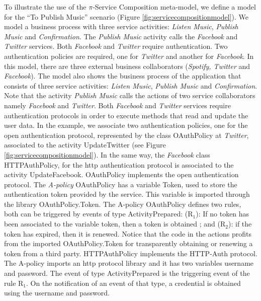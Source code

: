 \begin{example}\label{ex:toPublicMusic4}
To illustrate the use of the $\pi$-Service Composition meta-model, we define a model for the ``To Publish Music'' scenario (Figure \ref{fig:servicecompositionmodel}). 
 We model a business process with three service activities: {\em Listen Music}, {\em Publish Music} and {\em Confirmation}. 
The {\em Publish Music} activity calls the {\em Facebook} and {\em Twitter} services.
Both {\em Facebook} and {\em Twitter} require authentication. 
Two authentication policies are required, one for {\em Twitter} and another for {\em Facebook}.
In this model, there are three external business collaborators ({\em Spotify, Twitter} and {\em Facebook}).
The model also shows the business process of the application that consists of three service activities: {\em Listen Music}, {\em Publish Music} and {\em Confirmation}. 
Note that  the activity {\em Publish Music} calls the actions of two service collaborators namely {\em Facebook} and {\em Twitter}.
Both {\em Facebook} and {\em Twitter} services require authentication protocols in order to execute methods that read and update the user data. 
In the example, we  associate two authentication policies, one for the open authentication protocol, represented by the class {\sf\small OAuthPolicy} at {\em Twitter}, associated to the activity  {\sf\small UpdateTwitter} (see Figure \ref{fig:servicecompositionmodel}). 
In the same way, the {\em Facebook} class {\sf\small HTTPAuthPolicy}, for the http authentication protocol is associated to the activity {\sf\small UpdateFacebook}.
{\sf\small OAuthPolicy} implements the open authentication protocol.
The {\em A-policy} {\sf\small OAuthPolicy} has a variable {\sf\small Token}, used to store the authentication token provided by the service.
This variable is imported through the library {\sf\small OAuthPolicy.Token}. 
The A-policy {\sf\small OAuthPolicy} defines two rules, both can be triggered by events of type {\sf\small ActivityPrepared}: (R$_1$): If no token has been associated to the variable {\sf\small token}, then a token is obtained ; and (R$_2$): if the token has expired, then it is renewed. 
Notice that the code in the actions profits from the imported {\sf\small OAuthPolicy.Token} for transparently obtaining or renewing a token from a third party.
{\sf\small HTTPAuthPolicy} implements the HTTP-Auth protocol. 
The A-policy imports an http protocol library and it has two variables {\sf\small username} and {\sf\small password}.  
The event of type {\sf\small ActivityPrepared} is the triggering event of the rule {\sf\small R$_1$}. 
On the notification of an event of that type, a credential is obtained using the username and password. 
\end{example}

